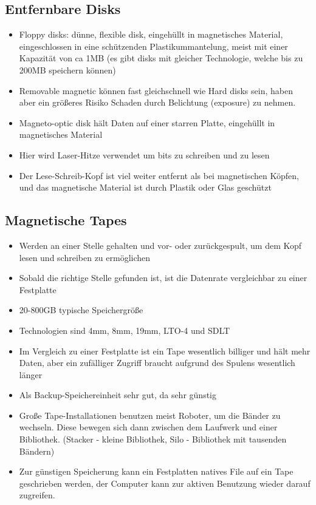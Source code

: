 \documentclass[a4paper]{scrreprt}
\begin{document}
\subsection{Entfernbare Disks}
\begin{itemize}
	\item Floppy disks: dünne, flexible disk, eingehüllt in magnetisches Material, eingeschlossen in eine schützenden Plastikummantelung, meist mit einer Kapazität von ca 1MB (es gibt disks mit gleicher Technologie, welche bis zu 200MB speichern können)
	\item Removable magnetic  können fast gleichschnell wie Hard disks sein, haben aber ein größeres Risiko Schaden durch Belichtung (exposure) zu nehmen.
	\item Magneto-optic disk hält Daten auf einer starren Platte, eingehüllt in magnetisches Material
	\item Hier wird Laser-Hitze verwendet um bits zu schreiben und zu lesen
	\item Der Lese-Schreib-Kopf ist viel weiter entfernt als bei magnetischen Köpfen, und das magnetische Material ist durch Plastik oder Glas geschützt
\end{itemize}
\subsection{Magnetische Tapes}
\begin{itemize}
	\item Werden an einer Stelle gehalten und vor- oder zurückgespult, um dem Kopf lesen und schreiben zu ermöglichen
	\item Sobald die richtige Stelle gefunden ist, ist die Datenrate vergleichbar zu einer Festplatte
	\item 20-800GB typische Speichergröße
	\item Technologien sind 4mm, 8mm, 19mm, LTO-4 und SDLT
	\item Im Vergleich zu einer Festplatte ist ein Tape wesentlich billiger und hält mehr Daten, aber ein zufälliger Zugriff braucht aufgrund des Spulens wesentlich länger
	\item Als Backup-Speichereinheit sehr gut, da sehr günstig
	\item Große Tape-Installationen benutzen meist Roboter, um die Bänder zu wechseln. Diese bewegen sich dann zwischen dem Laufwerk und einer Bibliothek. (Stacker - kleine Bibliothek, Silo - Bibliothek mit tausenden Bändern)
	\item Zur günstigen Speicherung kann ein Festplatten natives File auf ein Tape geschrieben werden, der Computer kann zur aktiven Benutzung wieder darauf zugreifen.
\end{itemize}
\end{document}
